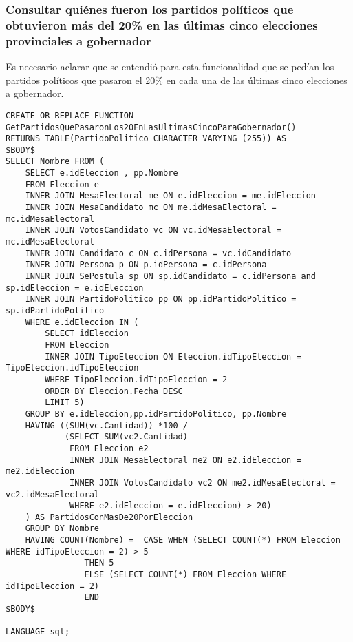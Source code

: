 \subsubsection{Consultar quiénes fueron los partidos políticos que obtuvieron más del 20\% en las últimas cinco elecciones provinciales a gobernador}

\indent \indent Es necesario aclarar que se entendió para esta funcionalidad que se pedían los partidos políticos que pasaron el 20\% en cada una de las últimas cinco elecciones a gobernador.\\

\begin{verbatim}
CREATE OR REPLACE FUNCTION GetPartidosQuePasaronLos20EnLasUltimasCincoParaGobernador()
RETURNS TABLE(PartidoPolitico CHARACTER VARYING (255)) AS
$BODY$
SELECT Nombre FROM (
    SELECT e.idEleccion , pp.Nombre
    FROM Eleccion e
    INNER JOIN MesaElectoral me ON e.idEleccion = me.idEleccion
    INNER JOIN MesaCandidato mc ON me.idMesaElectoral = mc.idMesaElectoral
    INNER JOIN VotosCandidato vc ON vc.idMesaElectoral = mc.idMesaElectoral
    INNER JOIN Candidato c ON c.idPersona = vc.idCandidato 
    INNER JOIN Persona p ON p.idPersona = c.idPersona
    INNER JOIN SePostula sp ON sp.idCandidato = c.idPersona and sp.idEleccion = e.idEleccion
    INNER JOIN PartidoPolitico pp ON pp.idPartidoPolitico = sp.idPartidoPolitico
    WHERE e.idEleccion IN (
        SELECT idEleccion
        FROM Eleccion 
        INNER JOIN TipoEleccion ON Eleccion.idTipoEleccion = TipoEleccion.idTipoEleccion
        WHERE TipoEleccion.idTipoEleccion = 2
        ORDER BY Eleccion.Fecha DESC
        LIMIT 5)
    GROUP BY e.idEleccion,pp.idPartidoPolitico, pp.Nombre
    HAVING ((SUM(vc.Cantidad)) *100 /
            (SELECT SUM(vc2.Cantidad) 
             FROM Eleccion e2 
             INNER JOIN MesaElectoral me2 ON e2.idEleccion = me2.idEleccion
             INNER JOIN VotosCandidato vc2 ON me2.idMesaElectoral = vc2.idMesaElectoral
             WHERE e2.idEleccion = e.idEleccion) > 20)
    ) AS PartidosConMasDe20PorEleccion
    GROUP BY Nombre
    HAVING COUNT(Nombre) =  CASE WHEN (SELECT COUNT(*) FROM Eleccion WHERE idTipoEleccion = 2) > 5 
                THEN 5 
                ELSE (SELECT COUNT(*) FROM Eleccion WHERE idTipoEleccion = 2)
                END  
$BODY$

LANGUAGE sql;

\end{verbatim}